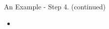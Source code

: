 \begin{frame}[t]{An Example - Step 4. (continued)}
  \begin{itemize}
    \setlength{\itemsep}{0.12cm}
      \item {}
  \end{itemize}
\end{frame}
